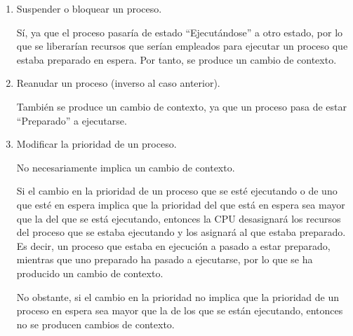 \begin{ejercicio}
\begin{enumerate}
        \item Suspender o bloquear un proceso.

        Sí, ya que el proceso pasaría de estado ``Ejecutándose'' a otro estado, por lo que se liberarían recursos que serían empleados para ejecutar un proceso que estaba preparado en espera. Por tanto, se produce un cambio de contexto.
        
        \begin{comment}
        Sí, ya que el SO debe suspender la ejecución del proceso y colocarlo en una lista de procesos bloqueados o en espera. La suspensión del proceso implica que se debe guardar su estado actual y liberar los recursos que estaba utilizando.
        \end{comment}
    
        \item Reanudar un proceso (inverso al caso anterior).

        También se produce un cambio de contexto, ya que un proceso pasa de estar ``Preparado'' a ejecutarse.
        \begin{comment}
        Sí, ya que el SO debe recuperar el estado del proceso previamente suspendido y asignarle los recursos necesarios para su ejecución. Además, el sistema operativo debe actualizar la lista de procesos en ejecución o en espera para reflejar el cambio en el estado del proceso reanudado.
        \end{comment}

        \item Modificar la prioridad de un proceso.

        No necesariamente implica un cambio de contexto.
        
        Si el cambio en la prioridad de un proceso que se esté ejecutando o de uno que esté en espera implica que la prioridad del que está en espera sea mayor que la del que se está ejecutando, entonces la CPU desasignará los recursos del proceso que se estaba ejecutando y los asignará al que estaba preparado. Es decir, un proceso que estaba en ejecución a pasado a estar preparado, mientras que uno preparado ha pasado a ejecutarse, por lo que se ha producido un cambio de contexto.

        No obstante, si el cambio en la prioridad no implica que la prioridad de un proceso en espera sea mayor que la de los que se están ejecutando, entonces no se producen cambios de contexto.
        
        \begin{comment}
        No necesariamente implica un cambio de contexto. Si el cambio en la prioridad del proceso no afecta la asignación de recursos o la planificación del procesador, entonces el procesamiento de esta llamada al sistema no requerirá un cambio de contexto. Sin embargo, si el cambio de prioridad implica que el proceso deba ser movido a una cola de procesos de mayor o menor prioridad, o si se le debe asignar un tiempo de ejecución diferente, entonces se requerirá un cambio de contexto
        \end{comment}
    \end{enumerate}
\end{ejercicio}

